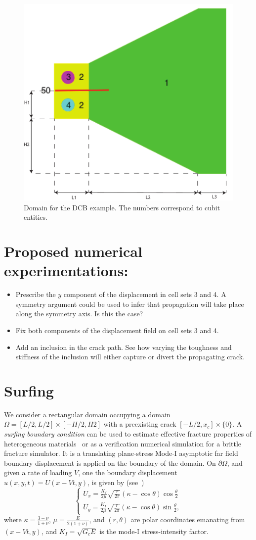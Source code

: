 \documentclass[10pt,oneside]{memoir}
\begin{document}
\begin{figure}[H]
\centering
	\includegraphics[width = .5\textwidth]{Examples/DCB/Geometry.pdf}
\caption{Domain for the DCB example. The numbers correspond to cubit entities.}
\label{fig:DCB}
\end{figure}

\section*{Proposed numerical experimentations:}
\begin{itemize}
	\item Prescribe the $y$ component of the displacement in cell sets 3 and 4. A symmetry argument could be used to infer that propagation will take place along the symmetry axis. Is this the case? 
	\item Fix both components of the displacement field on cell sets 3 and 4. 
	\item Add an inclusion in the crack path. See how varying the toughness and stiffness of the inclusion will either capture or divert the propagating crack.
\end{itemize}


\section{Surfing}
We consider a rectangular domain occupying a domain $\Omega = [L/2,L/2] \times [-H/2,H2]$ with a preexisting crack $[-L/2,x_c] \times \{0\}$.
A \emph{surfing boundary condition} can be used to estimate effective fracture properties of heterogeneous materials~\cite{Hossein-Hsueh-EtAl-2014a} or as a verification numerical simulation for a brittle fracture simulator. 
It is a translating plane-stress Mode-I asymptotic far field boundary displacement is applied on the boundary of the domain. 
On $\partial \Omega$, and given a rate of loading $V$, one the boundary displacement $u(x,y,t) = U(x-Vt,y)$,  is given by (see~\cite{Zehnder-2012a})
\begin{equation}
\left\{
\begin{array}{l}
\displaystyle U_x = \frac{K_I}{2\mu}\sqrt{\frac{r}{2\pi}}(\kappa-\cos\theta)\cos{\frac{\theta}{2}}\\
\displaystyle U_y =\frac{K_I}{2\mu}\sqrt{\frac{r}{2\pi}}(\kappa-\cos\theta)\sin{\frac{\theta}{2}},
\end{array}
\right.
\end{equation}
where $\kappa = \frac{3-\nu}{1+\nu}$, $\mu = \frac{E}{2(1+\nu)}$, and $(r , \theta)$ are polar coordinates emanating from $(x-Vt,y)$, and $K_I = \sqrt{G_c E}$ is the mode-I stress-intensity factor.
\end{document}
